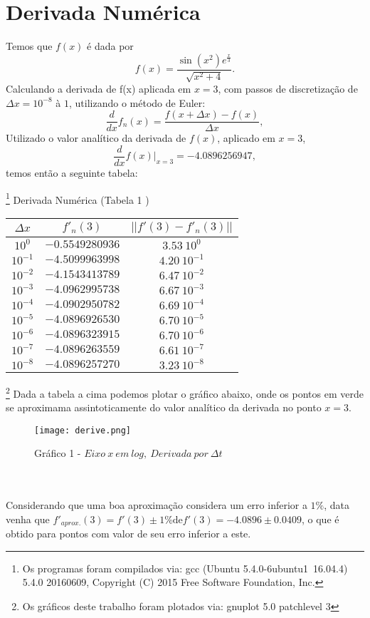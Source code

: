 \documentclass[pdftex,10pt,a4paper]{article}
\begin{document}
\section{Derivada Numérica}
Temos que $f(x)$ é dada por
\begin{equation}
f(x) = \frac{\sin(x^2)e^{\frac{x}{3}}}{\sqrt{x^2+4}}.
\end{equation}
Calculando a derivada de f(x) aplicada em $x = 3$, com passos de discretização de $\Delta x = 10^{-8}$ à $1$, utilizando o método de Euler: 
\begin{equation}
\frac{d}{dx}f_n(x) = \frac{f(x+\Delta x) - f(x)}{\Delta x},
\end{equation}
Utilizado o valor analítico da derivada de $f(x)$, aplicado em $x=3$,
\[\frac{d}{dx}f(x)\vert_{x=3} = -4.0896256947,\]
temos então a seguinte tabela:
\begin{center}
\footnote{Os programas foram compilados via: gcc (Ubuntu 5.4.0-6ubuntu1~16.04.4) 5.4.0 20160609, Copyright (C) 2015 Free Software Foundation, Inc.}
Derivada Numérica (Tabela 1 )\\
\begin{tabular}{c c c}
\hline 
$\Delta x$ & $f'_n(3)$ & $\vert\vert f'(3) - f'_n(3)\vert\vert$ \\ 
\hline
$10^{0}$  & $-0.5549280936$	& $3.53\ 10^{0}$\\
$10^{-1}$ & $-4.5099963998$	& $4.20\ 10^{-1}$\\
$10^{-2}$ & $-4.1543413789$	& $6.47\ 10^{-2}$\\
$10^{-3}$ & $-4.0962995738$	& $6.67\ 10^{-3}$\\
$10^{-4}$ & $-4.0902950782$	& $6.69\ 10^{-4}$\\
$10^{-5}$ & $-4.0896926530$	& $6.70\ 10^{-5}$\\
$10^{-6}$ & $-4.0896323915$	& $6.70\ 10^{-6}$\\
$10^{-7}$ & $-4.0896263559$	& $6.61\ 10^{-7}$\\
$10^{-8}$ & $-4.0896257270$	& $3.23\ 10^{-8}$\\
\hline
\end{tabular}
\end{center}
\footnote{Os gráficos deste trabalho foram plotados via: gnuplot 5.0 patchlevel 3}
Dada a tabela a cima podemos plotar o gráfico abaixo, onde os pontos em verde se aproximama assintoticamente do valor analítico da derivada no ponto $x=3$.\\

\begin{figure}[h!]
	\centering
	\texttt{[image: derive.png]}
	\caption*{{\scriptsize Gráfico 1 - $Eixo\ x\ em\ log,\ Derivada\ por\ \Delta t$}}
\end{figure}\\
\\
Considerando que uma boa aproximação considera um erro inferior a $1\%$, data venha que $f'_{aprox.}(3)= f'(3) \pm 1\% \text{de} f'(3)  = -4.0896 \pm 0.0409$, o que é obtido para pontos com valor de seu erro inferior a este.\\
\end{document}
